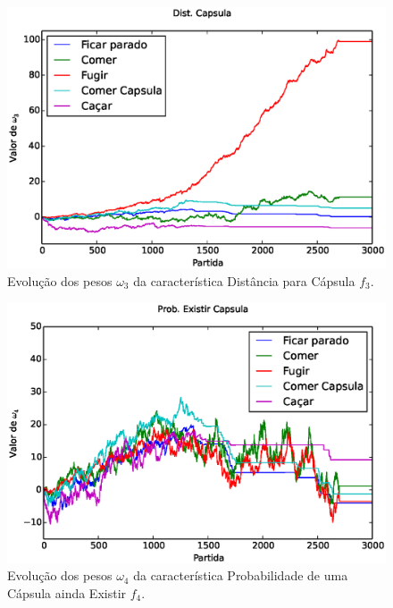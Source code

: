\begin{figure}[H]
    \centering
    \includegraphics[width=\linewidth]{images/5_behaviors_small_map/weights____pol__DistCapsula}
    \caption{Evolução dos pesos $ \omega_3 $ da característica Distância para Cápsula $ f_3 $.}
    \label{img:5ComportamentosMapaPequeno:PesoDistCapsula}
\end{figure}

\begin{figure}[H]
    \centering
    \includegraphics[width=\linewidth]{images/5_behaviors_small_map/weights____pol__ProbExistirCapsula}
    \caption{Evolução dos pesos $ \omega_4 $ da característica Probabilidade de uma Cápsula ainda Existir $ f_4 $.}
    \label{img:5ComportamentosMapaPequeno:PesoProbCapsulaExistir}
\end{figure}

